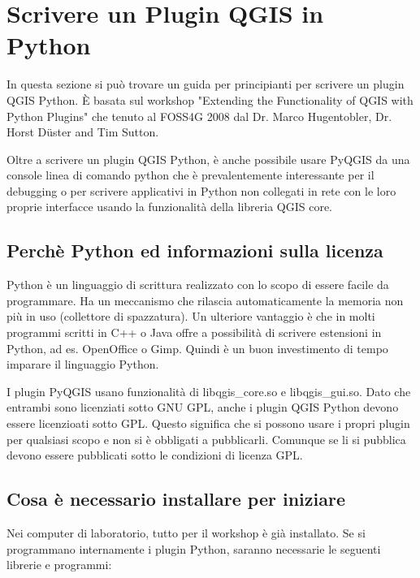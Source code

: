 
\section{Scrivere un Plugin QGIS in Python}


In questa sezione si può trovare un guida per principianti per scrivere un plugin QGIS Python. È basata sul workshop "Extending the Functionality of QGIS
with Python Plugins" che tenuto al FOSS4G 2008 dal Dr. Marco Hugentobler, Dr. Horst
D\"uster and Tim Sutton. 

Oltre a scrivere un plugin QGIS Python, è anche possibile usare PyQGIS da una console linea di comando python che è prevalentemente interessante per il debugging o per scrivere applicativi in Python non collegati in rete con le loro proprie interfacce usando la funzionalità della libreria QGIS core.

\subsection{Perchè Python ed informazioni sulla licenza}

Python è un linguaggio di scrittura realizzato con lo scopo di essere facile da programmare. Ha un meccanismo che rilascia automaticamente la memoria non più in uso (collettore di spazzatura). Un ulteriore vantaggio è che in molti programmi scritti in C++ o Java offre a possibilità di scrivere estensioni in Python, ad es. OpenOffice o Gimp. Quindi è un buon investimento di tempo imparare il linguaggio Python.

I plugin PyQGIS usano funzionalità di libqgis\_core.so e libqgis\_gui.so. Dato che entrambi sono licenziati sotto GNU GPL, anche i plugin QGIS Python devono essere licenzioati sotto GPL. Questo significa che si possono usare i propri plugin per qualsiasi scopo e non si è obbligati a pubblicarli. Comunque se li si pubblica devono essere pubblicati sotto le condizioni di licenza GPL.

\subsection{Cosa è necessario installare per iniziare}

Nei computer di laboratorio, tutto per il workshop è già installato. Se si programmano internamente i plugin Python, saranno necessarie le seguenti librerie e programmi:

